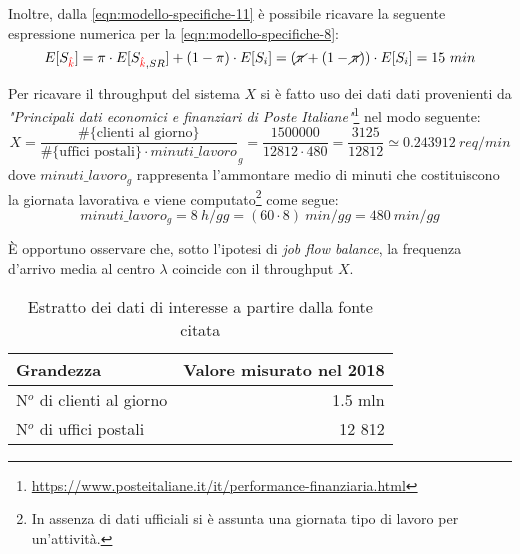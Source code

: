 Inoltre, dalla \ref{eqn:modello-specifiche-11} è possibile ricavare la seguente espressione numerica per la \ref{eqn:modello-specifiche-8}:
\begin{equation}
E[S_{\color{red}\hat{k}}] = \pi \cdot E[S_{{\color{red}\hat{k}}, SR}] + (1-\pi) \cdot E[S_i] = (\cancel{\pi} + (1 - \cancel{\pi}))\cdot E[S_i] = 15\ min
\end{equation}

Per ricavare il throughput del sistema $X$ si è fatto uso dei dati dati provenienti da \textsl{"Principali dati economici e finanziari di Poste Italiane"}\footnote{\url{https://www.posteitaliane.it/it/performance-finanziaria.html}} nel modo seguente:
\begin{equation}
X = \frac{\# \lbrace \text{clienti al giorno} \rbrace}{\# \lbrace \text{uffici postali} \rbrace \cdot minuti\_lavoro}_{g} = \frac{1500000}{12812\cdot 480} = \frac{3125}{12812} \simeq 0.243912\ req/min
\end{equation} 
dove $minuti\_lavoro_{g}$ rappresenta l'ammontare medio di minuti che costituiscono la giornata lavorativa e viene computato\footnote{In assenza di dati ufficiali si è assunta una giornata tipo di lavoro per un'attività.} come segue:
\begin{equation}
\label{eqn:modello-specifiche-15}
minuti\_lavoro_{g} = 8\ h/gg = (60 \cdot 8)\ min/gg = 480\ min/gg
\end{equation}

È opportuno osservare che, sotto l'ipotesi di \textsl{job flow balance}, la frequenza d'arrivo media al centro $\lambda$ coincide con il throughput $X$.

\begin{table}[ht]
\centering
{\tablecolors
\begin{tabular}{| l | r |}
\hline
Grandezza & Valore misurato nel 2018 \\
\hline
N$^o$ di clienti al giorno & 1.5 mln \\
\hline
N$^o$ di uffici postali & 12 812 \\
\hline
\end{tabular}}
\caption{Estratto dei dati di interesse a partire dalla fonte citata}
\label{table:modello-specifiche-2}
\end{table}